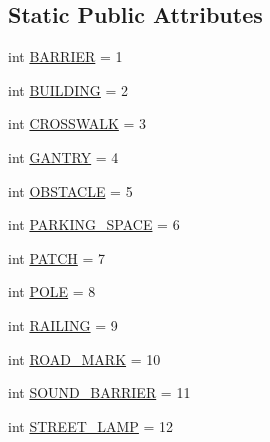 \subsection*{Static Public Attributes}
\begin{DoxyCompactItemize}
\item 
int \hyperlink{classimplementation_1_1data__model_1_1entity_1_1_misc_object_category_afab099a879b6af98ebbafaf48f889ae3}{B\+A\+R\+R\+I\+ER} = 1
\item 
int \hyperlink{classimplementation_1_1data__model_1_1entity_1_1_misc_object_category_a861ae00367cb5000e6fc17414036c54f}{B\+U\+I\+L\+D\+I\+NG} = 2
\item 
int \hyperlink{classimplementation_1_1data__model_1_1entity_1_1_misc_object_category_a6a4397ef20c35d4a8b8cedd09d5775d4}{C\+R\+O\+S\+S\+W\+A\+LK} = 3
\item 
int \hyperlink{classimplementation_1_1data__model_1_1entity_1_1_misc_object_category_ad54abbc963f623903799a70650725085}{G\+A\+N\+T\+RY} = 4
\item 
int \hyperlink{classimplementation_1_1data__model_1_1entity_1_1_misc_object_category_a8efaa312a1a5904be8d4ea5b2e250ece}{O\+B\+S\+T\+A\+C\+LE} = 5
\item 
int \hyperlink{classimplementation_1_1data__model_1_1entity_1_1_misc_object_category_a4a1cec9a93440279a022c686fbea42a1}{P\+A\+R\+K\+I\+N\+G\+\_\+\+S\+P\+A\+CE} = 6
\item 
int \hyperlink{classimplementation_1_1data__model_1_1entity_1_1_misc_object_category_a4b4112a35bd838b10ef7f1a6d718b9e2}{P\+A\+T\+CH} = 7
\item 
int \hyperlink{classimplementation_1_1data__model_1_1entity_1_1_misc_object_category_a1ee9f34bf6efd00f6b208d1bc2a21080}{P\+O\+LE} = 8
\item 
int \hyperlink{classimplementation_1_1data__model_1_1entity_1_1_misc_object_category_adef155c599c983ba57269bdef5524731}{R\+A\+I\+L\+I\+NG} = 9
\item 
int \hyperlink{classimplementation_1_1data__model_1_1entity_1_1_misc_object_category_a368ead63b1536bc115fe49c35c2c5fb4}{R\+O\+A\+D\+\_\+\+M\+A\+RK} = 10
\item 
int \hyperlink{classimplementation_1_1data__model_1_1entity_1_1_misc_object_category_a59ed45890d63616b9c6c9588c26ee73c}{S\+O\+U\+N\+D\+\_\+\+B\+A\+R\+R\+I\+ER} = 11
\item 
int \hyperlink{classimplementation_1_1data__model_1_1entity_1_1_misc_object_category_a7f023fbe03ec4d9d9d78682d5b45e066}{S\+T\+R\+E\+E\+T\+\_\+\+L\+A\+MP} = 12

\end{DoxyCompactItemize}
